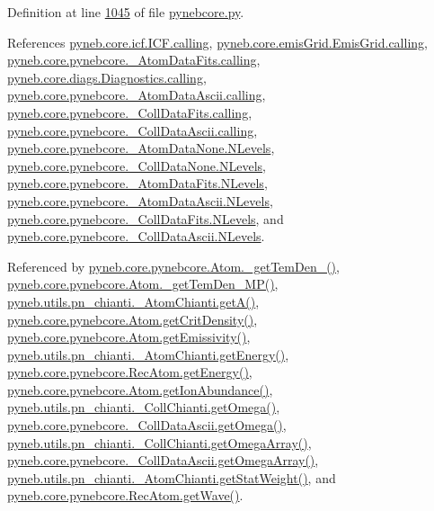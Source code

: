 Definition at line \hyperlink{pynebcore_8py_source_l01045}{1045} of file \hyperlink{pynebcore_8py_source}{pynebcore.\-py}.



References \hyperlink{icf_8py_source_l00016}{pyneb.\-core.\-icf.\-I\-C\-F.\-calling}, \hyperlink{emis_grid_8py_source_l00044}{pyneb.\-core.\-emis\-Grid.\-Emis\-Grid.\-calling}, \hyperlink{pynebcore_8py_source_l00097}{pyneb.\-core.\-pynebcore.\-\_\-\-Atom\-Data\-Fits.\-calling}, \hyperlink{diags_8py_source_l00169}{pyneb.\-core.\-diags.\-Diagnostics.\-calling}, \hyperlink{pynebcore_8py_source_l00318}{pyneb.\-core.\-pynebcore.\-\_\-\-Atom\-Data\-Ascii.\-calling}, \hyperlink{pynebcore_8py_source_l00585}{pyneb.\-core.\-pynebcore.\-\_\-\-Coll\-Data\-Fits.\-calling}, \hyperlink{pynebcore_8py_source_l00936}{pyneb.\-core.\-pynebcore.\-\_\-\-Coll\-Data\-Ascii.\-calling}, \hyperlink{pynebcore_8py_source_l00069}{pyneb.\-core.\-pynebcore.\-\_\-\-Atom\-Data\-None.\-N\-Levels}, \hyperlink{pynebcore_8py_source_l00082}{pyneb.\-core.\-pynebcore.\-\_\-\-Coll\-Data\-None.\-N\-Levels}, \hyperlink{pynebcore_8py_source_l00098}{pyneb.\-core.\-pynebcore.\-\_\-\-Atom\-Data\-Fits.\-N\-Levels}, \hyperlink{pynebcore_8py_source_l00319}{pyneb.\-core.\-pynebcore.\-\_\-\-Atom\-Data\-Ascii.\-N\-Levels}, \hyperlink{pynebcore_8py_source_l00586}{pyneb.\-core.\-pynebcore.\-\_\-\-Coll\-Data\-Fits.\-N\-Levels}, and \hyperlink{pynebcore_8py_source_l00933}{pyneb.\-core.\-pynebcore.\-\_\-\-Coll\-Data\-Ascii.\-N\-Levels}.



Referenced by \hyperlink{pynebcore_8py_source_l01869}{pyneb.\-core.\-pynebcore.\-Atom.\-\_\-get\-Tem\-Den\-\_()}, \hyperlink{pynebcore_8py_source_l02046}{pyneb.\-core.\-pynebcore.\-Atom.\-\_\-get\-Tem\-Den\-\_\-\-M\-P()}, \hyperlink{pn__chianti_8py_source_l00316}{pyneb.\-utils.\-pn\-\_\-chianti.\-\_\-\-Atom\-Chianti.\-get\-A()}, \hyperlink{pynebcore_8py_source_l01759}{pyneb.\-core.\-pynebcore.\-Atom.\-get\-Crit\-Density()}, \hyperlink{pynebcore_8py_source_l01782}{pyneb.\-core.\-pynebcore.\-Atom.\-get\-Emissivity()}, \hyperlink{pn__chianti_8py_source_l00366}{pyneb.\-utils.\-pn\-\_\-chianti.\-\_\-\-Atom\-Chianti.\-get\-Energy()}, \hyperlink{pynebcore_8py_source_l02927}{pyneb.\-core.\-pynebcore.\-Rec\-Atom.\-get\-Energy()}, \hyperlink{pynebcore_8py_source_l02176}{pyneb.\-core.\-pynebcore.\-Atom.\-get\-Ion\-Abundance()}, \hyperlink{pn__chianti_8py_source_l00507}{pyneb.\-utils.\-pn\-\_\-chianti.\-\_\-\-Coll\-Chianti.\-get\-Omega()}, \hyperlink{pynebcore_8py_source_l01082}{pyneb.\-core.\-pynebcore.\-\_\-\-Coll\-Data\-Ascii.\-get\-Omega()}, \hyperlink{pn__chianti_8py_source_l00484}{pyneb.\-utils.\-pn\-\_\-chianti.\-\_\-\-Coll\-Chianti.\-get\-Omega\-Array()}, \hyperlink{pynebcore_8py_source_l01058}{pyneb.\-core.\-pynebcore.\-\_\-\-Coll\-Data\-Ascii.\-get\-Omega\-Array()}, \hyperlink{pn__chianti_8py_source_l00343}{pyneb.\-utils.\-pn\-\_\-chianti.\-\_\-\-Atom\-Chianti.\-get\-Stat\-Weight()}, and \hyperlink{pynebcore_8py_source_l02699}{pyneb.\-core.\-pynebcore.\-Rec\-Atom.\-get\-Wave()}.


